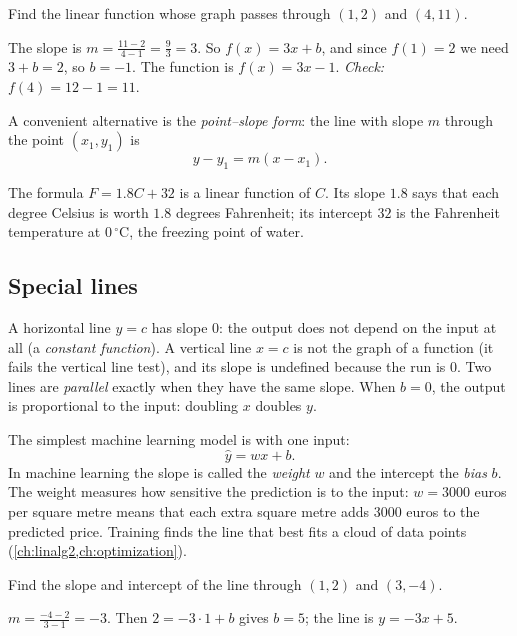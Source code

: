 \begin{example}\label{ex:line-through-points}
Find the linear function whose graph passes through $(1, 2)$ and $(4, 11)$.

\sol The slope is $m = \frac{11 - 2}{4 - 1} = \frac93 = 3$. So $f(x) = 3x + b$,
and since $f(1) = 2$ we need $3 + b = 2$, so $b = -1$. The function is
$f(x) = 3x - 1$. \emph{Check:} $f(4) = 12 - 1 = 11$. \checkmark
\end{example}

A convenient alternative is the \emph{point--slope form}: the line with slope
$m$ through the point $(x_1, y_1)$ is
\[
  y - y_1 = m(x - x_1).
\]

\begin{example}
The formula $F = 1.8C + 32$ is a linear function of $C$. Its slope $1.8$ says
that each degree Celsius is worth $1.8$ degrees Fahrenheit; its intercept $32$
is the Fahrenheit temperature at $0\,^\circ$C, the freezing point of water.
\end{example}

\subsection{Special lines}

A horizontal line $y = c$ has slope $0$: the output does not depend on the
input at all (a \emph{constant function}). A vertical line $x = c$ is not the
graph of a function (it fails the vertical line test), and its slope is
undefined because the run is $0$. Two lines are \emph{parallel} exactly when
they have the same slope. When $b = 0$, the output is proportional to the
input: doubling $x$ doubles $y$.

\begin{mlnote}
The simplest machine learning model is  with one input:
\[
  \hat y = wx + b .
\]
In machine learning the slope is called the \emph{weight} $w$ and the
intercept the \emph{bias} $b$. The weight measures how sensitive the
prediction is to the input: $w = 3000$ euros per square metre means that each
extra square metre adds $3000$ euros to the predicted price. Training finds
the line that best fits a cloud of data points (\cref{ch:linalg2,ch:optimization}).
\end{mlnote}

\sectionexercises

\begin{exercise}
Find the slope and intercept of the line through $(1, 2)$ and $(3, -4)$.
\end{exercise}
\begin{solution}
$m = \tfrac{-4 - 2}{3 - 1} = -3$. Then $2 = -3 \cdot 1 + b$ gives $b = 5$; the
line is $y = -3x + 5$.
\end{solution}

